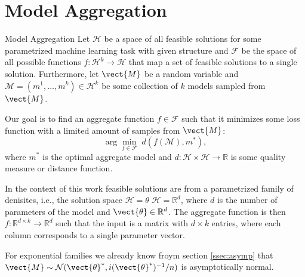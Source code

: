 
\chapter{Model Aggregation}
\label{chapter:ch3}

\begin{definition}[parbox=false]{Model Aggregation}
    Let $\mathcal{H}$ be a space of all feasible solutions for some parametrized machine learning task with given structure and $\mathcal{F}$ be the space of all possible functions $f: \mathcal{H}^k \rightarrow \mathcal{H}$ that map a set of feasible solutions to a single solution.
    Furthermore, let $\vect{M}$ be a random variable and $\mathcal{M} = (m^1, \ldots, m^k) \in \mathcal{H}^k$ be some collection of $k$ models sampled from $\vect{M}$.

    Our goal is to find an aggregate function $f \in \mathcal{F}$ such that it minimizes some loss function with a limited amount of samples from $\vect{M}$:
    \begin{equation}
        \label{eq:regret}
        \arg\min_{f \in \mathcal{F}} \; d(f(\mathcal{\mathcal{M}}), m^*),
    \end{equation}
    where $m^*$ is the optimal aggregate model and $d: \mathcal{H} \times \mathcal{H} \rightarrow \mathbb{R}$ is some quality measure or distance function.
\end{definition}

In the context of this work feasible solutions are from a parametrized family of denisites, i.e., the solution space $\mathcal{H} = \theta$
$\mathcal{H} = \mathbb{R}^d$, where $d$ is the number of parameters of the model and $\vect{\theta} \in \mathbb{R}^d$.
The aggregate function is then $f: \mathbb{R}^{d \times k} \rightarrow \mathbb{R}^{d}$ such that the input is a matrix with $d \times k$ entries, where each column corresponds to a single parameter vector.

For exponential families we already know froym section \ref{ssec:asymp} that $\vect{M} \sim \mathcal{N}(\vect{\theta}^*, i(\vect{\theta}^*)^{-1}/n)$ is asymptotically normal.

